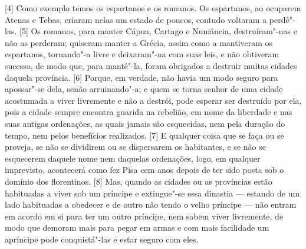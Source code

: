 {[}4{]} Como exemplo temos os espartanos e os romanos. Os espartanos, ao
ocuparem Atenas e Tebas, criaram nelas um estado de poucos, contudo
voltaram a perdê"-las. {[}5{]} Os romanos, para manter Cápua, Cartago e
Numância, destruíram"-nas e não as perderam; quiseram manter a Grécia,
assim como a mantiveram os espartanos, tornando"-a livre e deixaram"-na
com suas leis, e não obtiveram sucesso, de modo que, para mantê"-la,
foram obrigados a destruir muitas cidades daquela província. {[}6{]}
Porque, em verdade, não havia um modo seguro para apossar"-se dela, senão
arruinando"-a; e quem se torna senhor de uma cidade acostumada a viver
livremente e não a destrói, pode esperar ser destruído por ela, pois a
cidade sempre encontra guarida na rebelião, em nome da
liberdade e
nas suas antigas ordenações, as quais jamais são esquecidas, nem pela
duração do tempo, nem pelos benefícios realizados. {[}7{]} E qualquer
coisa que se faça ou se proveja, se não se dividirem ou se dispersarem
os habitantes, e se não se esquecerem daquele nome nem daquelas
ordenações, logo, em qualquer imprevisto, acontecerá como fez Pisa cem
anos depois de ter sido posta sob o domínio dos florentinos. {[}8{]} Mas, quando as
cidades ou as províncias estão habituadas a viver sob um príncipe e
extingue"-se essa dinastia --- estando de um lado habituadas a obedecer e
de outro não tendo o velho príncipe --- não entram em acordo em si para
ter um outro príncipe, nem sabem viver livremente, de modo que demoram
mais para pegar em armas e com mais facilidade um apríncipe pode
conquistá"-las e estar seguro com eles.

